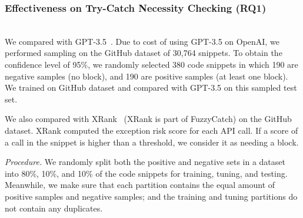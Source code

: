 \subsubsection{Effectiveness on Try-Catch Necessity Checking (RQ1)}~\\
 We compared {\xblock} with
GPT-3.5~\cite{ChatGPT}. Due to cost of using GPT-3.5 on OpenAI, we
performed sampling on the GitHub dataset of 30,764 snippets. To obtain
the confidence level of 95\%, we randomly selected 380 code snippets
in which 190 are negative samples (no  block), and 190
are positive samples (at least one  block). We trained
on GitHub dataset and compared with GPT-3.5 on this sampled test set.

We also compared {\xblock} with XRank~\cite{xrank-fse20} (XRank is
part of FuzzyCatch) on the GitHub dataset. XRank computed
the exception risk score for each API call. If a score of a call in
the snippet is higher than a threshold, we consider it as needing a
 block.

{\em Procedure.} We randomly split both the positive and negative sets
in a dataset into 80\%, 10\%, and 10\% of the code
snippets for training, tuning, and testing. Meanwhile, we make sure
that each partition contains the equal amount of positive samples and
negative samples; and the training and tuning partitions do not
contain any duplicates.


